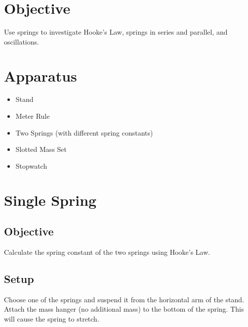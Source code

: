 \section*{Objective}

    Use springs to investigate Hooke's Law, springs in series and parallel, and oscillations.

\section*{Apparatus}

    \begin{itemize}

        \item Stand
        \item Meter Rule
        \item Two Springs (with different spring constants)
        \item Slotted Mass Set
        \item Stopwatch

    \end{itemize}

\setcounter{section}{0}
\section{Single Spring}

    \subsection*{Objective}

        Calculate the spring constant of the two springs using Hooke's Law.

    \subsection*{Setup}

        Choose one of the springs and suspend it from the horizontal arm of the stand. Attach the mass hanger (no additional mass) to the bottom of the spring. This will cause the spring to stretch.%

